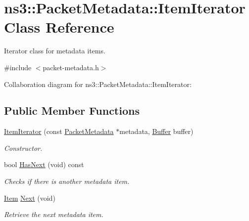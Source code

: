 \hypertarget{classns3_1_1PacketMetadata_1_1ItemIterator}{}\section{ns3\+:\+:Packet\+Metadata\+:\+:Item\+Iterator Class Reference}
\label{classns3_1_1PacketMetadata_1_1ItemIterator}


Iterator class for metadata items.  




{\ttfamily \#include $<$packet-\/metadata.\+h$>$}



Collaboration diagram for ns3\+:\+:Packet\+Metadata\+:\+:Item\+Iterator\+:
\subsection*{Public Member Functions}
\begin{DoxyCompactItemize}
\item 
\hyperlink{classns3_1_1PacketMetadata_1_1ItemIterator_acb9218e50f55d1ea4d952989b2bdcf71}{Item\+Iterator} (const \hyperlink{classns3_1_1PacketMetadata}{Packet\+Metadata} $\ast$metadata, \hyperlink{classns3_1_1Buffer}{Buffer} buffer)
\begin{DoxyCompactList}\small\item\em Constructor. \end{DoxyCompactList}\item 
bool \hyperlink{classns3_1_1PacketMetadata_1_1ItemIterator_abc9348e790ef50100bc1c26a9faf025b}{Has\+Next} (void) const 
\begin{DoxyCompactList}\small\item\em Checks if there is another metadata item. \end{DoxyCompactList}\item 
\hyperlink{structns3_1_1PacketMetadata_1_1Item}{Item} \hyperlink{classns3_1_1PacketMetadata_1_1ItemIterator_a3d59a1673dca4338f41d3c788ccd3e10}{Next} (void)
\begin{DoxyCompactList}\small\item\em Retrieve the next metadata item. \end{DoxyCompactList}\end{DoxyCompactItemize}
